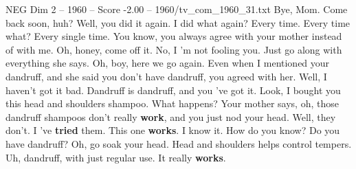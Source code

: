 \begin{textsample}{NEG Dim 2 – 1960 – Score -2.00 – 1960/tv\_com\_1960\_31.txt}  \label{ex:f2_neg_073}
Bye, Mom.
Come back soon, huh?
Well, you did it again.
I did what again?
Every time.
Every time what?
Every single time.
You know, you always agree with your mother instead of with me.
Oh, honey, come off it.
No, I 'm not fooling you.
Just go along with everything she says.
Oh, boy, here we go again.
Even when I mentioned your dandruff, and she said you don't have dandruff, you agreed with her.
Well, I haven't got it bad.
Dandruff is dandruff, and you 've got it.
Look, I bought you this head and shoulders shampoo.
What happens?
Your mother says, oh, those dandruff shampoos don't really \textbf{work}, and you just nod your head.
Well, they don't.
I 've \textbf{tried} them.
This one \textbf{works}.
I know it.
How do you know?
Do you have dandruff?
Oh, go soak your head.
Head and shoulders helps control tempers.
Uh, dandruff, with just regular use.
It really \textbf{works}.

\end{textsample}
